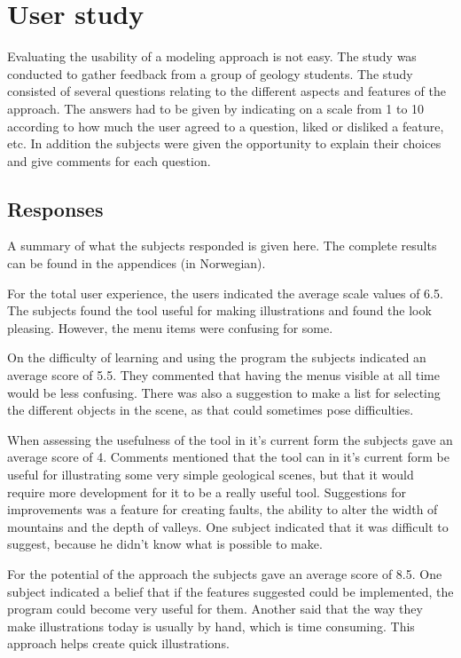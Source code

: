 \documentclass[a4paper,12pt]{report}
\begin{document}
\clearpage

\section{User study}
Evaluating the usability of a modeling approach is not easy. The study was conducted to gather feedback from a group of geology students. The study consisted of several questions relating to the different aspects and features of the approach. The answers had to be given by indicating on a scale from 1 to 10 according to how much the user agreed to a question, liked or disliked a feature, etc. In addition the subjects were given the opportunity to explain their choices and give comments for each question. 

\subsection{Responses}
A summary of what the subjects responded is given here. The complete results can be found in the appendices (in Norwegian). 

For the total user experience, the users indicated the average scale values of 6.5. The subjects found the tool useful for making illustrations and found the look pleasing. However, the menu items were confusing for some.

On the difficulty of learning and using the program the subjects indicated an average score of 5.5. They commented that having the menus visible at all time would be less confusing. There was also a suggestion to make a list for selecting the different objects in the scene, as that could sometimes pose difficulties.

When assessing the usefulness of the tool in it's current form the subjects gave an average score of 4. Comments mentioned that the tool can in it's current form be useful for illustrating some very simple geological scenes, but that it would require more development for it to be a really useful tool. Suggestions for improvements was a feature for creating faults, the ability to alter the width of mountains and the depth of valleys. One subject indicated that it was difficult to suggest, because he didn't know what is possible to make.

For the potential of the approach the subjects gave an average score of 8.5. One subject indicated a belief that if the features suggested could be implemented, the program could become very useful for them. Another said that the way they make illustrations today is usually by hand, which is time consuming. This approach helps create quick illustrations.
\end{document}
